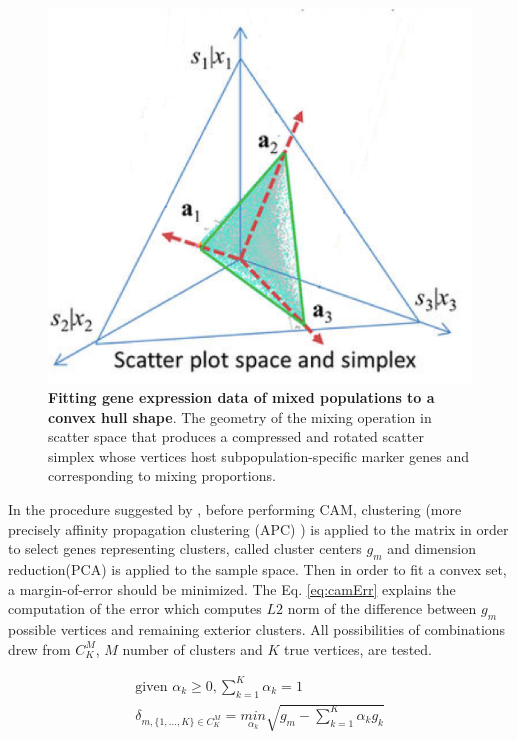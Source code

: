 \documentclass[12pt,]{book}
\theoremstyle{definition}
\theoremstyle{definition}
\theoremstyle{definition}
\theoremstyle{remark}
\begin{document}
\begin{figure}

{\centering \includegraphics[width=0.5\linewidth]{figures-ext/cam} 

}

\caption[Fitting gene expression data of mixed populations to a convex hull shape]{\textbf{Fitting gene expression data of mixed
populations to a convex hull shape}. The geometry of the mixing
operation in scatter space that produces a compressed and rotated
scatter simplex whose vertices host subpopulation-specific marker genes
and corresponding to mixing proportions.}\label{fig:cam}
\end{figure}







In the procedure suggested by \citet{Wang2013}, before performing CAM,
clustering (more precisely affinity propagation clustering (APC) ) is
applied to the matrix in order to select genes representing clusters,
called cluster centers \(g_m\) and dimension reduction(PCA) is applied
to the sample space. Then in order to fit a convex set, a
margin-of-error should be minimized. The Eq. \eqref{eq:camErr} explains
the computation of the error which computes \(L2\) norm of the
difference between \(g_m\) possible vertices and remaining exterior
clusters. All possibilities of combinations drew from \(C^M_K\), \(M\)
number of clusters and \(K\) true vertices, are tested.

\begin{equation}
\begin{aligned}
\text{given }\alpha_k \geq 0, \sum^K_{k=1}\alpha_k=1 \\
\delta_{m, \{1,...,K\} \in C^M_K }= \underset{\alpha_k}{min} \sqrt{{g_m} - \sum^K_{k=1}\alpha_kg_k} \label{eq:camErr}
\end{aligned}
\end{equation}
\end{document}
